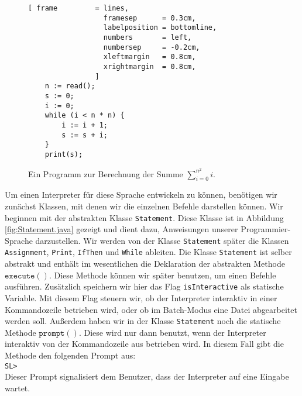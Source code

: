 \begin{figure}[!ht]
\centering
\begin{Verbatim}[ frame         = lines, 
                  framesep      = 0.3cm, 
                  labelposition = bottomline,
                  numbers       = left,
                  numbersep     = -0.2cm,
                  xleftmargin   = 0.8cm,
                  xrightmargin  = 0.8cm,
                ]
    n := read();
    s := 0;
    i := 0;
    while (i < n * n) {
        i := i + 1;
        s := s + i;
    }
    print(s);
\end{Verbatim}
\vspace*{-0.3cm}
\caption{Ein Programm zur Berechnung der Summe $\sum\limits_{i=0}^{n^2} i$.}
\label{fig:sum.sl}
\end{figure}



Um einen Interpreter f\"ur diese Sprache entwickeln zu k\"onnen, ben\"otigen wir
zun\"achst Klassen, mit denen wir die einzelnen Befehle darstellen k\"onnen.
Wir beginnen mit der abstrakten Klasse \texttt{Statement}.  Diese Klasse ist in Abbildung
\ref{fig:Statement.java} gezeigt und dient dazu,
Anweisungen unserer Programmier-Sprache darzustellen.
Wir werden von der Klasse \texttt{Statement} sp\"ater die Klassen
\texttt{Assignment}, \texttt{Print}, \texttt{IfThen} und \texttt{While} ableiten.
Die Klasse \texttt{Statement} ist selber abstrakt und enth\"alt 
im wesentlichen die Deklaration der abstrakten Methode $\texttt{execute}()$.  Diese Methode
k\"onnen wir sp\"ater benutzen, um einen Befehle ausf\"uhren.
Zus\"atzlich speichern wir hier das Flag \texttt{isInteractive} als statische Variable.  Mit
diesem Flag steuern wir, ob der Interpreter interaktiv in einer Kommandozeile betrieben
wird, oder ob im Batch-Modus eine Datei abgearbeitet werden soll.  Au{\ss}erdem haben wir in der
Klasse \texttt{Statement} noch die statische Methode $\texttt{prompt}()$.  Diese wird nur
dann benutzt, wenn der Interpreter interaktiv von der Kommandozeile aus betrieben wird.
In diesem Fall gibt die Methode den folgenden Prompt aus:
\\[0.2cm]
\hspace*{1.3cm}
\texttt{SL> }
\\[0.2cm]
Dieser Prompt signalisiert dem Benutzer, dass der Interpreter auf eine Eingabe wartet.

